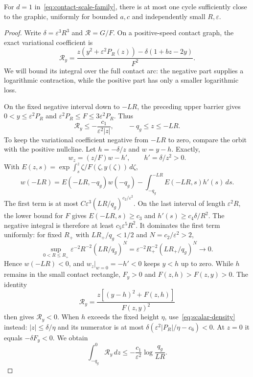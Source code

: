 \begin{proposition}\label{prop:scaled-positive-forcing}
For $d=1$ in~\eqref{eq:contact-scale-family}, there is at most
one cycle sufficiently close to the graphic, uniformly for bounded
$a,c$ and independently small $R,\varepsilon$.
\end{proposition}
\begin{proof}
Write $\delta=\varepsilon^3R^3$ and $\mathcal R=G/F$.
On a positive-speed contact graph, the exact variational coefficient is
\begin{equation}\label{eq:scalar-density}
 \mathcal R_y
 =\frac{z(y^2+\varepsilon^2P_R(z))
                   -\delta(1+bz-2y)}{F^2}.
\end{equation}
We will bound its integral over the full contact arc: the negative
part supplies a logarithmic contraction, while the positive part has
only a smaller logarithmic loss.

On the fixed negative interval down to $-LR$, the preceding upper
barrier gives $0<y\le\varepsilon^2P_R$ and
$\varepsilon^2P_R\le F\le3\varepsilon^2P_R$. Thus
\begin{equation}\label{eq:forcing-negative-density}
 \mathcal R_y\le-\frac{c_1}{\varepsilon^2|z|},
 \qquad -q_g\le z\le-LR.
\end{equation}
To keep the variational coefficient negative from $-LR$ to zero, compare
the orbit with the positive nullcline. Let $h=-\delta/z$ and
$w=y-h$. Exactly,
\[
 w_z=(z/F)w-h',\qquad h'=\delta/z^2>0.
\]
With $E(z,s)=\exp\int_s^z\zeta/F(\zeta,y(\zeta))\,d\zeta$,
\[
 w(-LR)=E(-LR,-q_g)w(-q_g)
                      -\int_{-q_g}^{-LR}E(-LR,s)h'(s)\,ds.
\]
The first term is at most
$C\varepsilon^3(LR/q_g)^{c_2/\varepsilon^2}$. On the last
interval of length $\varepsilon^2R$, the lower bound for $F$
gives $E(-LR,s)\ge c_3$ and $h'(s)\ge c_4\delta/R^2$.
The negative integral is therefore at least $c_5\varepsilon^5R^2$.
It dominates the first term uniformly: for fixed $R_+$ with
$LR_+/q_g<1/2$ and $N=c_2/\varepsilon^2>2$,
\[
 \sup_{0<R\le R_+}\varepsilon^{-2}R^{-2}(LR/q_g)^N
 =\varepsilon^{-2}R_+^{-2}(LR_+/q_g)^N\longrightarrow0.
\]
Hence $w(-LR)<0$, and $w_z|_{w=0}=-h'<0$ keeps $y<h$ up to zero.
While $h$ remains in the small contact rectangle, $F_y>0$ and
$F(z,h)>F(z,y)>0$. The identity
\begin{equation}\label{eq:nullcline-density}
 \mathcal R_y=\frac{z[(y-h)^2+F(z,h)]}{F(z,y)^2}
\end{equation}
then gives $\mathcal R_y<0$. When $h$ exceeds the fixed height
$\eta$, use~\eqref{eq:scalar-density} instead: $|z|\le\delta/\eta$
and its numerator is at most
$\delta(\varepsilon^2|P_R|/\eta-c_6)<0$.
At $z=0$ it equals $-\delta F_y<0$. We obtain
\begin{equation}\label{eq:forcing-negative-integral}
 \int_{-q_g}^0\mathcal R_y\,dz
       \le-\frac{c_1}{\varepsilon^2}\log\frac{q_g}{LR}.
\end{equation}


\end{proof}
